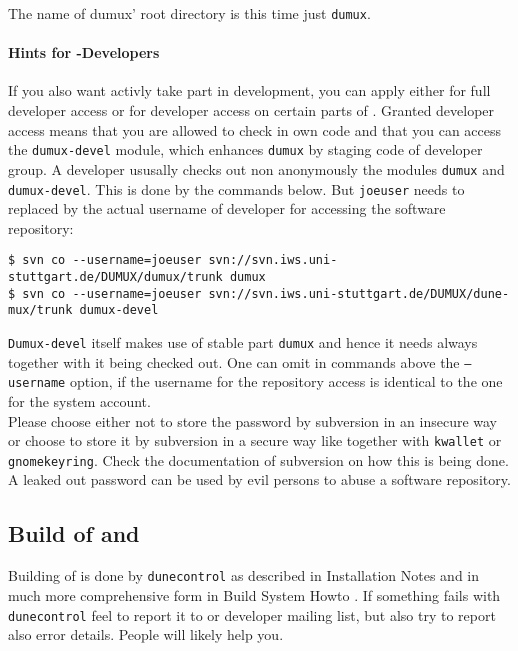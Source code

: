 The name of dumux' root directory is this time just \texttt{dumux}.

\paragraph{Hints for \Dumux-Developers}
If you also want activly take part in \Dumux development, you can apply either for full developer
access or for developer access on certain parts of \Dumux. Granted developer access means that
you are allowed to check in own code and that you can access the \texttt{dumux-devel} module,
which enhances \texttt{dumux} by staging code of developer group.
A developer ususally checks out non anonymously the modules \texttt{dumux} and \texttt{dumux-devel}.
This is done by the commands below. But \texttt{joeuser} needs to replaced by
the actual username of developer for accessing the software repository:

\begin{lstlisting}[style=Bash]
$ svn co --username=joeuser svn://svn.iws.uni-stuttgart.de/DUMUX/dumux/trunk dumux
$ svn co --username=joeuser svn://svn.iws.uni-stuttgart.de/DUMUX/dune-mux/trunk dumux-devel
\end{lstlisting}

\texttt{Dumux-devel} itself makes use of stable part \texttt{dumux} and hence it needs always together with it being checked out. 
One can omit in commands above the \texttt{--username} option, if the username for the repository access is
identical to the one for the system account.\\

Please choose either not to store the password by subversion in an insecure way or
choose to store it by subversion in a secure way like together with \texttt{kwallet} or \texttt{gnomekeyring}.
Check the documentation of subversion on how this is being done.
A leaked out password can be used by evil persons to abuse a software repository.

\subsection{Build of \Dune and \Dumux}
\label{buildIt}
Building of \Dune is done by \texttt{dunecontrol} as described in \Dune Installation Notes \cite{DUNE-INST}
and in much more comprehensive form in \Dune Build System Howto \cite{DUNE-BS}.
If something fails with \texttt{dunecontrol} feel to report it to \Dune or \Dumux developer mailing list,
but also try to report also error details. People will likely help you.\\

